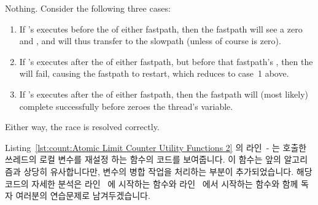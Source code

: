 \begin{lineref}
{	Nothing.
	Consider the following three cases:
	\begin{enumerate}
	\item	If 's  executes
		before the  of either fastpath,
		then the fastpath will see a zero  and
		, and will thus transfer to the slowpath
		(unless of course  is zero).
	\item	If 's  executes
		after the  of either fastpath,
		but before that fastpath's ,
		then the  will fail, causing the
		fastpath to restart, which reduces to case~1 above.
	\item	If 's  executes
		after the  of either fastpath,
		then the fastpath will (most likely) complete successfully
		before  zeroes the thread's
		 variable.
	\end{enumerate}
	Either way, the race is resolved correctly.
	\fi
} \QuickQuizEnd

\begin{lineref}
Listing~\ref{lst:count:Atomic Limit Counter Utility Functions 2} 의
라인~- 는 호출한 쓰레드의 로컬 
변수를 재설정 하는  함수의 코드를 보여줍니다.
이 함수는 앞의 알고리즘과 상당히 유사합니다만,  변수의 병합
작업을 처리하는 부분이 추가되었습니다.
해당 코드의 자세한 분석은 라인~ 에 시작하는
 함수와 라인~ 에서 시작하는
 함수와 함께 독자 여러분의 연습문제로
남겨두겠습니다.

\end{lineref}


\end{lineref}

